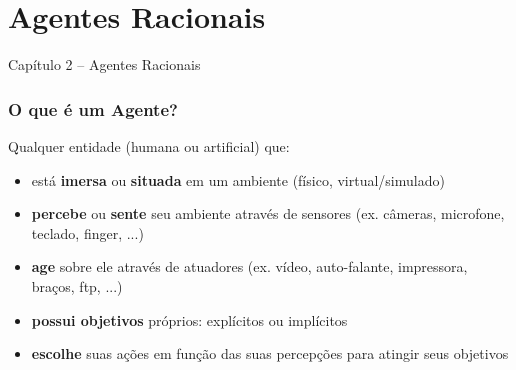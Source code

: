 


\section{Agentes Racionais}


\begin{frame}

\begin{center}
{\huge Capítulo 2 -- Agentes Racionais}
\end{center}

\end{frame}




\begin{frame} %

    \frametitle{O que é um Agente?}

\begin{block}{Qualquer entidade (humana ou artificial) que:}
  
  \begin{itemize}
    \item está \textbf{imersa} ou \textbf{situada} em um ambiente (físico, virtual/simulado) 
    \item \textbf{percebe} ou \textbf{sente} seu ambiente através de sensores (ex. câmeras, microfone, teclado, finger, ...)
    \item \textbf{age} sobre ele através de atuadores (ex. vídeo, auto-falante, impressora, braços, ftp, ...)
    \item \textbf{possui objetivos} próprios:
explícitos ou implícitos
    \item \textbf{escolhe} suas ações em função das suas percepções para atingir seus objetivos
  
  \end{itemize}
  
\end{block}

\end{frame}



